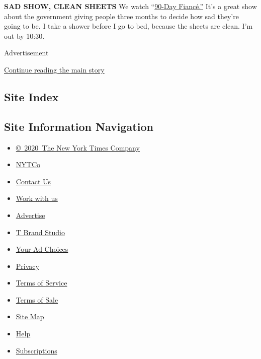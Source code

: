 \textbf{SAD SHOW, CLEAN SHEETS} We watch
``\href{https://www.tlc.com/tv-shows/90-day-fiance/}{90-Day Fiancé.''}
It's a great show about the government giving people three months to
decide how sad they're going to be. I take a shower before I go to bed,
because the sheets are clean. I'm out by 10:30.

Advertisement

\protect\hyperlink{after-bottom}{Continue reading the main story}

\hypertarget{site-index}{%
\subsection{Site Index}\label{site-index}}

\hypertarget{site-information-navigation}{%
\subsection{Site Information
Navigation}\label{site-information-navigation}}

\begin{itemize}
\tightlist
\item
  \href{https://help.nytimes3xbfgragh.onion/hc/en-us/articles/115014792127-Copyright-notice}{©~2020~The
  New York Times Company}
\end{itemize}

\begin{itemize}
\tightlist
\item
  \href{https://www.nytco.com/}{NYTCo}
\item
  \href{https://help.nytimes3xbfgragh.onion/hc/en-us/articles/115015385887-Contact-Us}{Contact
  Us}
\item
  \href{https://www.nytco.com/careers/}{Work with us}
\item
  \href{https://nytmediakit.com/}{Advertise}
\item
  \href{http://www.tbrandstudio.com/}{T Brand Studio}
\item
  \href{https://www.nytimes3xbfgragh.onion/privacy/cookie-policy\#how-do-i-manage-trackers}{Your
  Ad Choices}
\item
  \href{https://www.nytimes3xbfgragh.onion/privacy}{Privacy}
\item
  \href{https://help.nytimes3xbfgragh.onion/hc/en-us/articles/115014893428-Terms-of-service}{Terms
  of Service}
\item
  \href{https://help.nytimes3xbfgragh.onion/hc/en-us/articles/115014893968-Terms-of-sale}{Terms
  of Sale}
\item
  \href{https://spiderbites.nytimes3xbfgragh.onion}{Site Map}
\item
  \href{https://help.nytimes3xbfgragh.onion/hc/en-us}{Help}
\item
  \href{https://www.nytimes3xbfgragh.onion/subscription?campaignId=37WXW}{Subscriptions}
\end{itemize}
